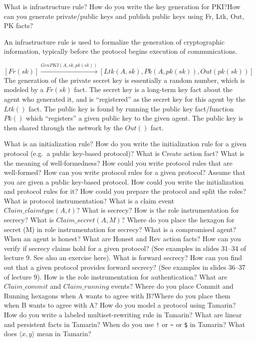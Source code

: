 \begin{questions}
\question{} What is infrastructure rule? How do you write the key generation for PKI?\@ How can you generate private/public keys and publish public keys using Fr, Ltk, Out, PK facts?
  \begin{solution}
    An infrastructure rule is used to formalize the generation of cryptographic information, typically before the protocol begins execution of communications.

    \begin{equation}\label{eq:PKI_Infrastructure_Rule}
      [Fr(sk)] \overset{GenPKI(A, sk, pk(sk))}{\longrightarrow} [Ltk(A, sk), Pk(A, pk(sk)), Out(pk(sk))]
    \end{equation}
    The generation of the private secret key is essentially a random number, which is modeled by a $Fr(sk)$ fact.
    The secret key is a long-term key fact about the agent who generated it, and is ``registered'' as the secret key for this agent by the $Ltk()$ fact.
    The public key is found by running the public key fact/function $Pk()$ which ``registers'' a given public key to the given agent.
    The public key is then shared through the network by the $Out()$ fact.
  \end{solution}

\question{} What is an initialization rule? How do you write the initialization rule for a given protocol (e.g.\ a public key-based protocol)? What is Create action fact?
\question{} What is the meaning of well-formedness? How could you write protocol rules that are well-formed?
\question{} How can you write protocol rules for a given protocol?
\question{} Assume that you are given a public key-based protocol. How could you write the initialization and protocol rules for it? How could you prepare the protocol and split the roles?
\question{} What is protocol instrumentation? What is a claim event $Claim\_claimtype(A,t)$?
\question{} What is secrecy?
\question{} How is the role instrumentation for secrecy? What is $Claim\_secret(A,M)$? Where do you place the hexagon for secret (M) in role instrumentation for secrecy?
\question{} What is a compromised agent? When an agent is honest? What are Honest and Rev action facts?
\question{} How can you verify if secrecy claims hold for a given protocol? (See examples in slides 31--34 of lecture 9. See also an exercise here).
\question{} What is forward secrecy?
\question{} How can you find out that a given protocol provides forward secrecy? (See examples in slides 36--37 of lecture 9).
\question{} How is the role instrumentation for authentication? What are $Claim\_commit$ and $Claim\_running$ events? Where do you place Commit and Running hexagons when A wants to agree with B?\@ Where do you place them when B wants to agree with A?\@
\question{} How do you model a protocol using Tamarin? How do you write a labeled multiset-rewriting rule in Tamarin?
\question{} What are linear and persistent facts in Tamarin? When do you use \texttt{!} or \texttt{\textasciitilde{}} or \texttt{\$} in Tamarin?
\question{} What does $\langle x, y \rangle$ mean in Tamarin?
\end{questions}
